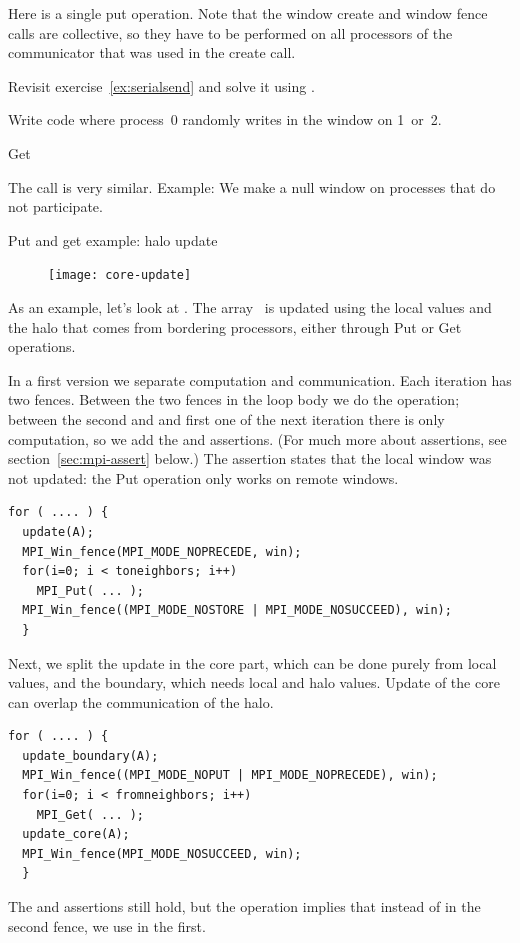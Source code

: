 Here is a single put operation. Note that the window create and window fence calls
are collective, so they have to be performed on all processors
of the communicator that was used in the create call.

\begin{exercise}
  \label{ex:rightput}
  Revisit exercise~\ref{ex:serialsend} and solve it using
  .
\end{exercise}

\begin{exercise}
  \label{ex:randomput}
  Write code where process~0 randomly writes in the window on 1~or~2.
\end{exercise}

 {Get}

The  call is very similar.
%
%
Example:
%
%
We make a null window on processes that do not participate.
%

 {Put and get example: halo update}

\begin{figure}
  \texttt{[image: core-update]}
\end{figure}
%
As an example, let's look at .
The array~ is updated using the local values and the halo
that comes from bordering processors, either through Put or Get operations.

In a first version we separate computation and communication.
Each iteration has two fences. Between the two fences in the loop body
we do the  operation; between the second and and first one
of the next iteration there is only computation, so we add the
 and  assertions. (For much more about
assertions, see section~\ref{sec:mpi-assert} below.)
The  assertion
states that the local window was not updated: the Put operation only
works on remote windows.
\begin{lstlisting}
for ( .... ) {
  update(A); 
  MPI_Win_fence(MPI_MODE_NOPRECEDE, win); 
  for(i=0; i < toneighbors; i++) 
    MPI_Put( ... );
  MPI_Win_fence((MPI_MODE_NOSTORE | MPI_MODE_NOSUCCEED), win); 
  }
\end{lstlisting}

Next, we split the update in the core part, which can be done purely
from local values, and the boundary, which needs local and halo
values. Update of the core can overlap the communication of the halo.
\begin{lstlisting}
for ( .... ) {
  update_boundary(A); 
  MPI_Win_fence((MPI_MODE_NOPUT | MPI_MODE_NOPRECEDE), win); 
  for(i=0; i < fromneighbors; i++) 
    MPI_Get( ... );
  update_core(A); 
  MPI_Win_fence(MPI_MODE_NOSUCCEED, win); 
  }
\end{lstlisting}
The  and  assertions still hold, but the
 operation implies that instead of  in the
second fence, we use  in the first.

